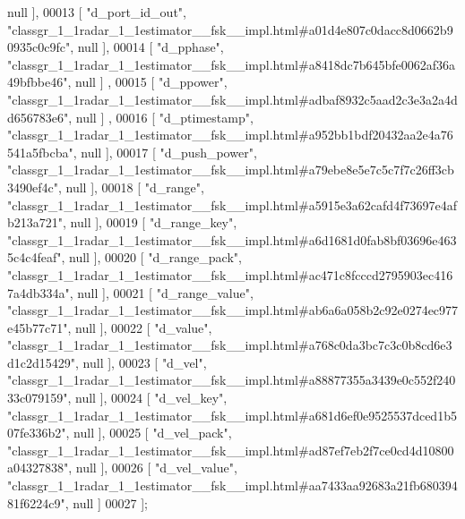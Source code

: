 \begin{DoxyCode}
      null ],
00013     [ \textcolor{stringliteral}{"d\_port\_id\_out"}, \textcolor{stringliteral}{"classgr\_1\_1radar\_1\_1estimator\_\_fsk\_\_impl.html#a01d4e807c0dacc8d0662b90935c0c9fc"}, 
      null ],
00014     [ \textcolor{stringliteral}{"d\_pphase"}, \textcolor{stringliteral}{"classgr\_1\_1radar\_1\_1estimator\_\_fsk\_\_impl.html#a8418dc7b645bfe0062af36a49bfbbe46"}, null ]
      ,
00015     [ \textcolor{stringliteral}{"d\_ppower"}, \textcolor{stringliteral}{"classgr\_1\_1radar\_1\_1estimator\_\_fsk\_\_impl.html#adbaf8932c5aad2c3e3a2a4dd656783e6"}, null ]
      ,
00016     [ \textcolor{stringliteral}{"d\_ptimestamp"}, \textcolor{stringliteral}{"classgr\_1\_1radar\_1\_1estimator\_\_fsk\_\_impl.html#a952bb1bdf20432aa2e4a76541a5fbcba"}, 
      null ],
00017     [ \textcolor{stringliteral}{"d\_push\_power"}, \textcolor{stringliteral}{"classgr\_1\_1radar\_1\_1estimator\_\_fsk\_\_impl.html#a79ebe8e5e7c5c7f7c26ff3cb3490ef4c"}, 
      null ],
00018     [ \textcolor{stringliteral}{"d\_range"}, \textcolor{stringliteral}{"classgr\_1\_1radar\_1\_1estimator\_\_fsk\_\_impl.html#a5915e3a62cafd4f73697e4afb213a721"}, null ],
00019     [ \textcolor{stringliteral}{"d\_range\_key"}, \textcolor{stringliteral}{"classgr\_1\_1radar\_1\_1estimator\_\_fsk\_\_impl.html#a6d1681d0fab8bf03696e4635c4c4feaf"}, 
      null ],
00020     [ \textcolor{stringliteral}{"d\_range\_pack"}, \textcolor{stringliteral}{"classgr\_1\_1radar\_1\_1estimator\_\_fsk\_\_impl.html#ac471c8fcccd2795903ec4167a4db334a"}, 
      null ],
00021     [ \textcolor{stringliteral}{"d\_range\_value"}, \textcolor{stringliteral}{"classgr\_1\_1radar\_1\_1estimator\_\_fsk\_\_impl.html#ab6a6a058b2c92e0274ec977e45b77c71"}, 
      null ],
00022     [ \textcolor{stringliteral}{"d\_value"}, \textcolor{stringliteral}{"classgr\_1\_1radar\_1\_1estimator\_\_fsk\_\_impl.html#a768c0da3bc7c3c0b8cd6e3d1c2d15429"}, null ],
00023     [ \textcolor{stringliteral}{"d\_vel"}, \textcolor{stringliteral}{"classgr\_1\_1radar\_1\_1estimator\_\_fsk\_\_impl.html#a88877355a3439e0c552f24033c079159"}, null ],
00024     [ \textcolor{stringliteral}{"d\_vel\_key"}, \textcolor{stringliteral}{"classgr\_1\_1radar\_1\_1estimator\_\_fsk\_\_impl.html#a681d6ef0e9525537dced1b507fe336b2"}, null 
      ],
00025     [ \textcolor{stringliteral}{"d\_vel\_pack"}, \textcolor{stringliteral}{"classgr\_1\_1radar\_1\_1estimator\_\_fsk\_\_impl.html#ad87ef7eb2f7ce0cd4d10800a04327838"}, null
       ],
00026     [ \textcolor{stringliteral}{"d\_vel\_value"}, \textcolor{stringliteral}{"classgr\_1\_1radar\_1\_1estimator\_\_fsk\_\_impl.html#aa7433aa92683a21fb68039481f6224c9"}, 
      null ]
00027 ];
\end{DoxyCode}

